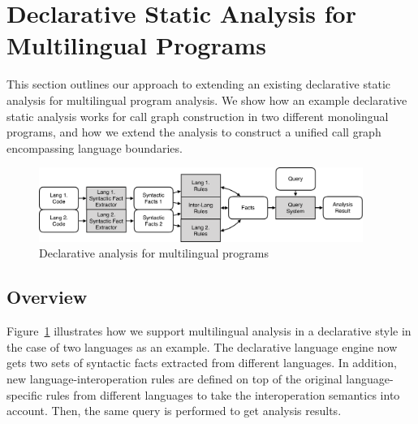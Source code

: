
\section{Declarative Static Analysis for Multilingual Programs}
This section outlines our approach to extending an existing
declarative static analysis for multilingual program analysis.
We show how an example declarative static analysis works
for call graph construction in two different monolingual programs, and
how we extend the analysis to construct a unified call graph
encompassing language boundaries.

\begin{figure}[t]
  \centering
  \vspace{2mm}
  \includegraphics[width=0.94\textwidth]{img/ov2.pdf}
  \caption{Declarative analysis for multilingual programs}
  \label{fig:ov2}
\end{figure}

\subsection{Overview}
Figure~\ref{fig:ov2} illustrates how we support multilingual analysis in a
declarative style in the case of two languages as an example. The declarative
language engine now gets two sets of syntactic facts extracted from different
languages. In addition, new language-interoperation rules are defined on top of
the original language-specific rules from different languages to take the
interoperation semantics into account. Then, the same query is performed to get
analysis results.

